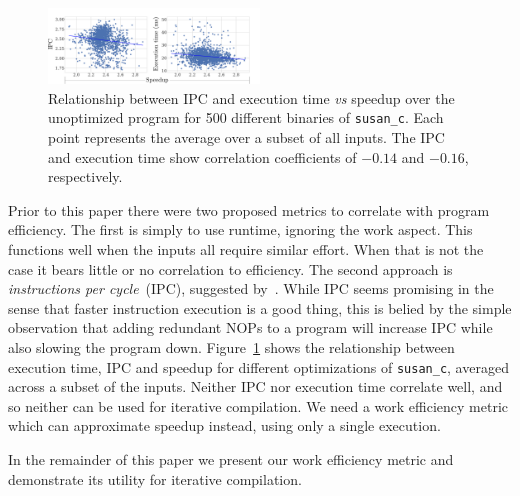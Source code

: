     \begin{figure}[t]
        \centering
        \includegraphics[width=0.5\textwidth]{figs/motivation-metric.pdf}
        \caption{
            Relationship between IPC and execution time \textit{vs} speedup over the unoptimized program
            for 500 different binaries of \texttt{susan\_c}.
            Each point represents the average over a subset of all inputs.
            The IPC and execution time show correlation coefficients of $-0.14$ and $-0.16$, respectively.
        }
        \label{fig:motivation-metric}
    \end{figure}

    Prior to this paper there were two proposed metrics to correlate with program efficiency. The first is simply to use runtime, ignoring
    the work aspect. This functions well when the inputs all require similar effort. When that is not the case it bears little or no
    correlation to efficiency. The second approach is \textit{instructions per cycle}~(IPC), suggested by~\citep{fursin07}. While IPC seems
    promising in the sense that faster instruction execution is a good thing, this is belied by the simple observation that adding
    redundant NOPs to a program will increase IPC while also slowing the program down. Figure~\ref{fig:motivation-metric} shows the
    relationship between execution time, IPC and speedup for different optimizations of \texttt{susan\_c}, averaged across a subset of the
    inputs. Neither IPC nor execution time correlate well, and so neither can be used for iterative compilation. We need a work efficiency
    metric which can approximate speedup instead, using only a single execution.

    In the remainder of this paper we present our work efficiency metric and demonstrate its utility for iterative compilation.
